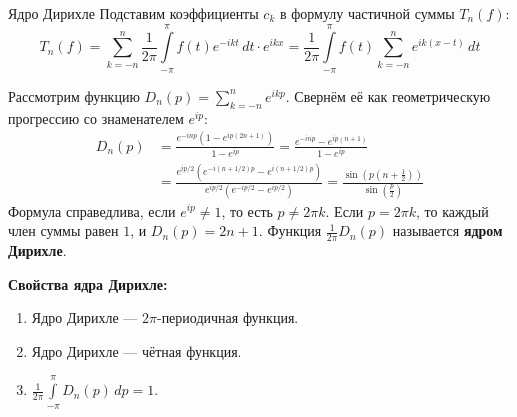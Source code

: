 \documentclass[12pt,a4paper]{article}
\begin{document}
\begin{Definition}{Ядро Дирихле}{}
Подставим коэффициенты $c_k$ в формулу частичной суммы $T_n(f)$:
$$ T_n(f) = \sum\limits_{k=-n}^n \frac{1}{2\pi} \int\limits_{-\pi}^\pi f(t) e^{-ikt} \, dt \cdot e^{ikx} = \frac{1}{2\pi} \int\limits_{-\pi}^\pi f(t) \sum\limits_{k=-n}^n e^{ik(x-t)} \, dt $$

Рассмотрим функцию $D_n(p) = \sum\limits_{k=-n}^n e^{ikp}$. Свернём её как геометрическую прогрессию со знаменателем $e^{ip}$:
\begin{align*}
    D_n(p) &= \frac{e^{-inp} \left( 1 - e^{ip(2n+1)} \right)}{1 - e^{ip}} = \frac{e^{-inp} - e^{ip(n+1)}}{1 - e^{ip}} \\
    &= \frac{e^{ip/2} \left( e^{-i(n+1/2)p} - e^{i(n+1/2)p} \right)}{e^{ip/2} \left( e^{-ip/2} - e^{ip/2} \right)} = \frac{\sin\left(p(n+\frac{1}{2})\right)}{\sin\left(\frac{p}{2}\right)}
\end{align*}
Формула справедлива, если $e^{ip} \neq 1$, то есть $p \neq 2\pi k$. 
Если $p = 2\pi k$, то каждый член суммы равен $1$, и $D_n(p) = 2n+1$.
Функция $\frac{1}{2\pi} D_n(p)$ называется \textbf{ядром Дирихле}.
\end{Definition}

\textbf{Свойства ядра Дирихле:}
\begin{enumerate}
    \item Ядро Дирихле — $2\pi$-периодичная функция.
    \item Ядро Дирихле — чётная функция.
    \item $\frac{1}{2\pi} \int\limits_{-\pi}^\pi D_n(p) \, dp = 1$.
\end{enumerate}

\begin{center}
\end{center}
\end{document}
